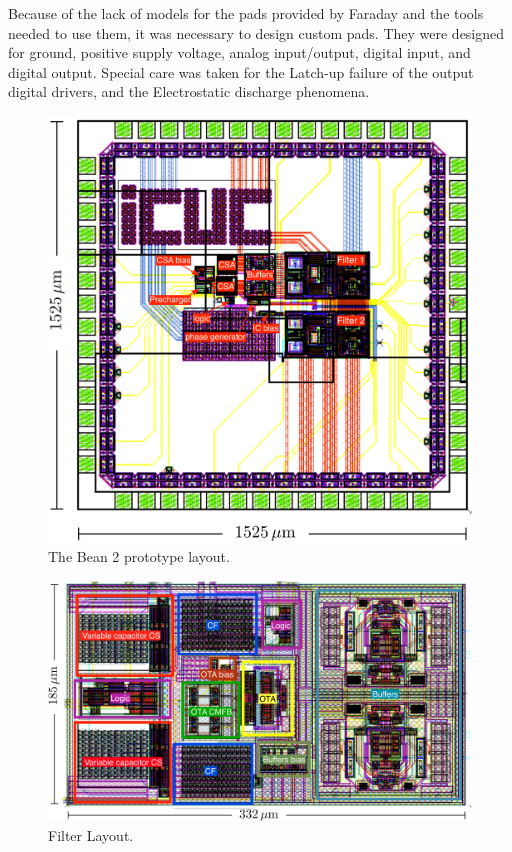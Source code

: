 Because of the lack of models for the pads provided by Faraday and the tools needed to use them, it was necessary to design custom pads. They were designed for ground, positive supply voltage, analog input/output, digital input, and digital output. Special care was taken for the Latch-up failure of the output digital drivers, and the Electrostatic discharge phenomena. 


\begin{figure}[!t]
	\centering
	\includegraphics[width=5in]{./Figures/IC_layout}
	\caption{The Bean 2 prototype layout.}\label{fig:IC_layout}
\end{figure}


\begin{figure}[!t]
	\centering
	\includegraphics[width=6in]{./Figures/filter_layout}
	\caption{Filter Layout.}\label{fig:filter_layout}
\end{figure}


